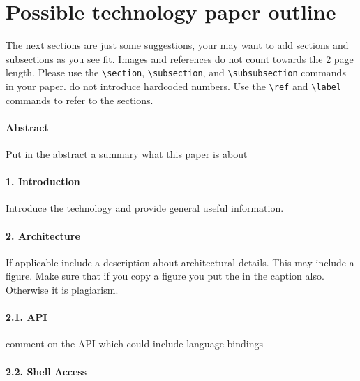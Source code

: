 \documentclass[9pt,twocolumn,twoside]{../../styles/osajnl}
\begin{document}
\section{Possible technology paper outline}

The next sections are just some suggestions, your may want to add
sections and subsections as you see fit. Images and references do not
count towards the 2 page length. Please use the \verb|\section|,
\verb|\subsection|, and \verb|\subsubsection| commands in your
paper. do not introduce hardcoded numbers. Use the \verb|\ref| and
\verb|\label| commands to refer
 to the sections.


\paragraph{Abstract}

Put in the abstract a summary what this paper is about

\paragraph{1. Introduction}

Introduce the technology and provide general useful information.

\paragraph{2. Architecture} 

If applicable include a description about architectural details. This
may include a figure. Make sure that if you copy a figure you put the
\cite{?} in the caption also. Otherwise it is plagiarism.

\paragraph{2.1. API}

comment on the API which could include language bindings

\paragraph{2.2. Shell Access}
\end{document}
